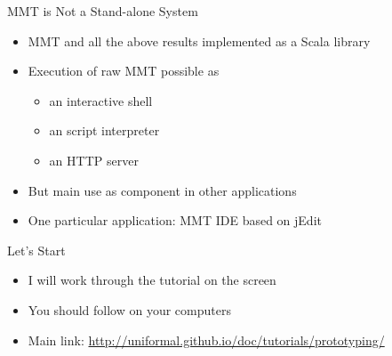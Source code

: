 \documentclass{beamer}
\renewcommand{\emph}[1]{\alert{#1}}
\begin{document}
\begin{myframe}{MMT is Not a Stand-alone System}
\begin{itemize}
 \item MMT and all the above results implemented as a Scala library
 \item Execution of raw MMT possible as
  \begin{itemize}
    \item an interactive shell
    \item an script interpreter
    \item an HTTP server
  \end{itemize}
 \item But main use as \emph{component in other applications}
 \item One particular application: MMT IDE based on jEdit
\end{itemize}
\end{myframe}

\begin{myframe}{Let's Start}
\begin{itemize}
 \item I will work through the tutorial on the screen
 \item You should follow on your computers
 \item Main link: \url{http://uniformal.github.io/doc/tutorials/prototyping/}
\end{itemize}
\end{myframe}
\end{document}
